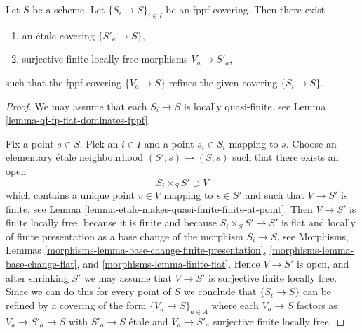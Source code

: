 \begin{lemma}
\label{lemma-dominate-fppf-etale-locally}
Let $S$ be a scheme. Let $\{S_i \to S\}_{i \in I}$ be an fppf covering.
Then there exist
\begin{enumerate}
\item an \'etale covering $\{S'_a \to S\}$,
\item surjective finite locally free morphisms $V_a \to S'_a$,
\end{enumerate}
such that the fppf covering $\{V_a \to S\}$ refines the given
covering $\{S_i \to S\}$.
\end{lemma}

\begin{proof}
We may assume that each $S_i \to S$ is locally quasi-finite, see
Lemma \ref{lemma-qf-fp-flat-dominates-fppf}.

\medskip\noindent
Fix a point $s \in S$. Pick an $i \in I$ and a point
$s_i \in S_i$ mapping to $s$. Choose an elementary \'etale neighbourhood
$(S', s) \to (S, s)$ such that there exists an open
$$
S_i \times_S S'  \supset V
$$
which contains a unique point $v \in V$ mapping to $s \in S'$
and such that $V \to S'$ is finite, see
Lemma \ref{lemma-etale-makes-quasi-finite-finite-at-point}.
Then $V \to S'$ is finite locally free, because it is finite
and because $S_i \times_S S' \to S'$ is flat and locally of finite presentation
as a base change of the morphism $S_i \to S$, see
Morphisms, Lemmas \ref{morphisms-lemma-base-change-finite-presentation},
\ref{morphisms-lemma-base-change-flat}, and
\ref{morphisms-lemma-finite-flat}.
Hence $V \to S'$ is open, and after shrinking $S'$
we may assume that $V \to S'$ is surjective finite locally free.
Since we can do this for every point of $S$ we conclude that
$\{S_i \to S\}$ can be refined by a covering of the form
$\{V_a \to S\}_{a \in A}$ where each $V_a \to S$ factors as
$V_a \to S'_a \to S$ with $S'_a \to S$ \'etale and $V_a \to S'_a$ surjective
finite locally free.
\end{proof}

